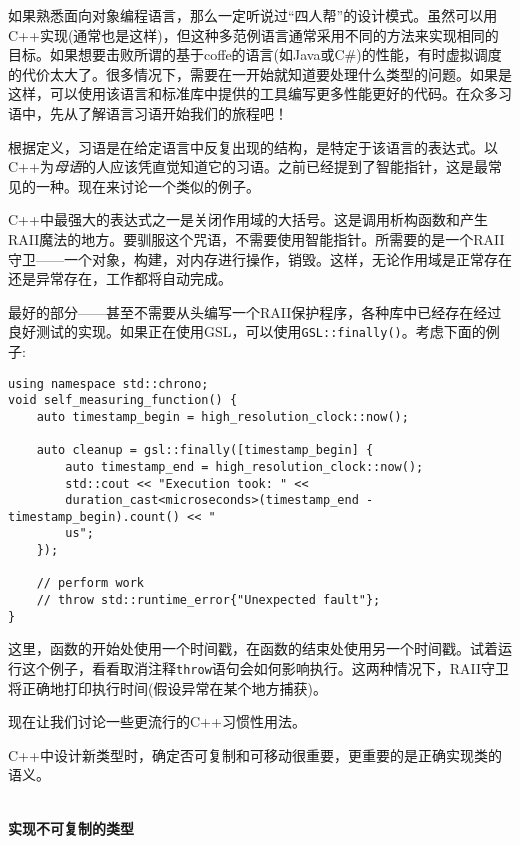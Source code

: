 
如果熟悉面向对象编程语言，那么一定听说过“四人帮”的设计模式。虽然可以用C++实现(通常也是这样)，但这种多范例语言通常采用不同的方法来实现相同的目标。如果想要击败所谓的基于coffe的语言(如Java或C\#)的性能，有时虚拟调度的代价太大了。很多情况下，需要在一开始就知道要处理什么类型的问题。如果是这样，可以使用该语言和标准库中提供的工具编写更多性能更好的代码。在众多习语中，先从了解语言习语开始我们的旅程吧！

根据定义，习语是在给定语言中反复出现的结构，是特定于该语言的表达式。以C++为\textit{母语}的人应该凭直觉知道它的习语。之前已经提到了智能指针，这是最常见的一种。现在来讨论一个类似的例子。


C++中最强大的表达式之一是关闭作用域的大括号。这是调用析构函数和产生RAII魔法的地方。要驯服这个咒语，不需要使用智能指针。所需要的是一个RAII守卫——一个对象，构建，对内存进行操作，销毁。这样，无论作用域是正常存在还是异常存在，工作都将自动完成。

最好的部分——甚至不需要从头编写一个RAII保护程序，各种库中已经存在经过良好测试的实现。如果正在使用GSL，可以使用\texttt{GSL::finally()}。考虑下面的例子:

\begin{lstlisting}[style=styleCXX]
using namespace std::chrono;
void self_measuring_function() {
	auto timestamp_begin = high_resolution_clock::now();
	
	auto cleanup = gsl::finally([timestamp_begin] {
		auto timestamp_end = high_resolution_clock::now();
		std::cout << "Execution took: " <<
		duration_cast<microseconds>(timestamp_end - timestamp_begin).count() << "
		us";
	});

	// perform work
	// throw std::runtime_error{"Unexpected fault"};
}
\end{lstlisting}

这里，函数的开始处使用一个时间戳，在函数的结束处使用另一个时间戳。试着运行这个例子，看看取消注释\texttt{throw}语句会如何影响执行。这两种情况下，RAII守卫将正确地打印执行时间(假设异常在某个地方捕获)。

现在让我们讨论一些更流行的C++习惯性用法。


C++中设计新类型时，确定否可复制和可移动很重要，更重要的是正确实现类的语义。

\hspace*{\fill} \\ %
\noindent
\textbf{实现不可复制的类型}

